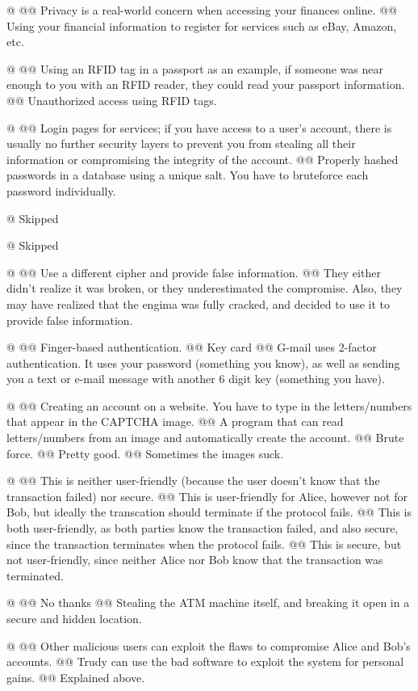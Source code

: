 \documentclass{article}
\begin{document}
\begin{easylist}
 	@
 	@@ Privacy is a real-world concern when accessing your finances online.
 	@@ Using your financial information to register for services such as eBay, Amazon, etc.
 	
 	@
 	@@ Using an RFID tag in a passport as an example, if someone was near enough to you with an RFID reader, they could read your passport information.
 	@@ Unauthorized access using RFID tags.
 	
 	@
 	@@ Login pages for services; if you have access to a user's account, there is usually no further security layers to prevent you from stealing all their information or compromising the integrity of the account.
 	@@ Properly hashed passwords in a database using a unique salt. You have to bruteforce each password individually.
 	
 	@ Skipped
 	
 	@ Skipped
 	
 	@
 	@@ Use a different cipher and provide false information.
 	@@ They either didn't realize it was broken, or they underestimated the compromise. Also, they may have realized that the engima was fully cracked, and decided to use it to provide false information.
 	
 	@
 	@@ Finger-based authentication.
 	@@ Key card
 	@@ G-mail uses 2-factor authentication. It uses your password (something you know), as well as sending you a text or e-mail message with another 6 digit key (something you have).
 	
 	@
 	@@ Creating an account on a website. You have to type in the letters/numbers that appear in the CAPTCHA image.
 	@@ A program that can read letters/numbers from an image and automatically create the account.
 	@@ Brute force.
 	@@ Pretty good.
 	@@ Sometimes the images suck.
 	
 	@
 	@@ This is neither user-friendly (because the user doesn't know that the transaction failed) nor secure.
 	@@ This is user-friendly for Alice, however not for Bob, but ideally the transcation should terminate if the protocol fails.
 	@@ This is both user-friendly, as both parties know the transaction failed, and also secure, since the transaction terminates when the protocol fails.
 	@@ This is secure, but not user-friendly, since neither Alice nor Bob know that the transaction was terminated.
 	
 	@
 	@@ No thanks
 	@@ Stealing the ATM machine itself, and breaking it open in a secure and hidden location.
 	
 	@
 	@@ Other malicious users can exploit the flaws to compromise Alice and Bob's accounts.
 	@@ Trudy can use the bad software to exploit the system for personal gains.
 	@@ Explained above.
 	

\end{easylist}
\end{document}
